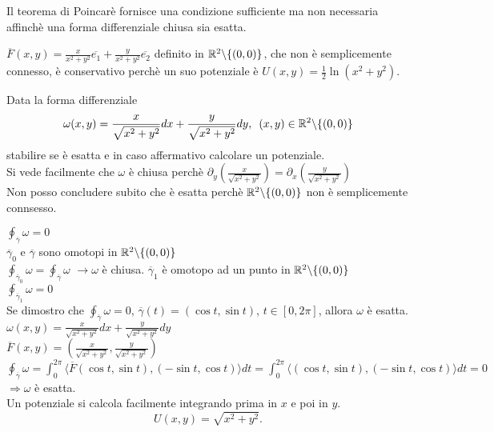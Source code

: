 	
\begin{attbar}
	Il teorema di Poincarè fornisce una condizione sufficiente ma non necessaria affinchè una forma differenziale chiusa sia esatta.
\end{attbar}
	
	
\begin{exbar}
	$\overline{F}(x,y)=\frac{x}{x^2+y^2}\overline{e_1}+\frac{y}{x^2+y^2}\overline{e_2}$ definito in $\mathbb{R}^2 \backslash \{(0,0)\}$, che non è semplicemente connesso, è conservativo perchè un suo potenziale è $ U(x,y)=\frac{1}{2}\ln (x^2+y^2)$.
\end{exbar}


\begin{exbar}
\begin{example}
	Data la forma differenziale 
	\begin{equation*}
		\omega(x,y)=\frac{x}{\sqrt{x^2+y^2}}dx + \frac{y}{\sqrt{x^2+y^2}}dy,\,\,\, (x,y)\in \mathbb{R}^2 \backslash \{(0,0)\}
	\end{equation*}
	stabilire se è esatta e in caso affermativo calcolare un potenziale.\\
	Si vede facilmente che $\omega$ è chiusa perchè $\partial_y\left(\frac{x}{\sqrt{x^2+y^2}}\right)=\partial_x\left(\frac{y}{\sqrt{x^2+y^2}}\right)$\\
	Non posso concludere subito che è esatta perchè $\mathbb{R}^2 \backslash \{(0,0)\}$ non è semplicemente connsesso.\\

	\segnaposto %

	$\oint_{\overline{\gamma}}\omega=0$\\
	$\overline{\gamma}_0$ e $\overline{\gamma}$ sono omotopi in $\mathbb{R}^2\backslash \{(0,0)\}$\\
	$\oint_{\overline{\gamma}_0}\omega=\oint_{\overline{\gamma}}\omega$ $\rightarrow \omega$ è chiusa.
	$\overline{\gamma}_1$ è omotopo ad un punto in $\mathbb{R}^2 \backslash \{(0,0)\}$\\
	$\oint_{\overline{\gamma}_1}\omega=0$\\
	Se dimostro che $\oint_{\overline{\gamma}}\omega=0$, $\overline{\gamma}(t)=(\cos t , \sin t)$, $t \in [0,2\pi]$, allora $\omega$ è esatta.\\
	$\omega(x,y)=\frac{x}{\sqrt{x^2+y^2}}dx + \frac{y}{\sqrt{x^2+y^2}}dy$\\
	$\overline{F}(x,y)=\left( \frac{x}{\sqrt{x^2+y^2}}, \frac{y}{\sqrt{x^2+y^2}} \right)$\\
	$\oint_{\overline{\gamma}}\omega =\int_0^{2\pi} \langle \overline{F}(\cos t,\sin t),(-\sin t, \cos t) \rangle dt = \int_0^{2\pi}\langle (\cos t, \sin t),(-\sin t, \cos t) \rangle dt =0$\\
	$\Rightarrow \omega$ è esatta.\\
	Un potenziale si calcola facilmente integrando prima in $x$ e poi in $y$.
	\begin{equation*}
		U(x,y)=\sqrt{x^2+y^2}.
	\end{equation*}
\end{example}
\end{exbar}


